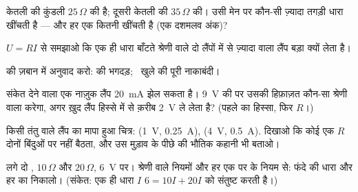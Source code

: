 \begin{exercise}[$\star$]\label{exo:g8:ohms-law:6}
केतली की कुंडली $25\,\Omega$ की है; दूसरी केतली की $35\,\Omega$ की।
उसी मेन पर कौन-सी ज़्यादा तगड़ी धारा खींचती है --- और हर एक कितनी
खींचती है (एक दशमलव अंक)?
\end{exercise}

\begin{exercise}[$\star$]\label{exo:g8:ohms-law:7}
$U = R I$ से समझाओ कि एक ही धारा बाँटते श्रेणी वाले दो लैंपों में से
ज़्यादा  वाला लैंप बड़ा  क्यों लेता है।
\end{exercise}

\begin{exercise}[$\star$]\label{exo:g8:ohms-law:8}
 की ज़बान में अनुवाद करो:  की भगदड़; \ खुले  की
पूरी नाकाबंदी।
\end{exercise}

\begin{exercise}[$\star\star$]\label{exo:g8:ohms-law:9}
संकेत देने वाला एक नाज़ुक लैंप \qty{20}{mA} झेल सकता है। \qty{9}{V}
की  पर उसकी हिफ़ाज़त कौन-सा श्रेणी वाला  करेगा, अगर
ख़ुद लैंप हिस्से में से क़रीब \qty{2}{V} ले लेता है? (पहले 
का हिस्सा, फिर $R$।)
\end{exercise}

\begin{exercise}[$\star\star$]\label{exo:g8:ohms-law:10}
किसी तंतु वाले लैंप का मापा हुआ चित्र: (\qty{1}{V}, \qty{0.25}{A}),
(\qty{4}{V}, \qty{0.5}{A}). दिखाओ कि कोई एक $R$ दोनों बिंदुओं पर
नहीं बैठता, और उस मुड़ाव के पीछे की भौतिक कहानी भी बताओ।
\end{exercise}

\begin{exercise}[$\star\star$]\label{exo:g8:ohms-law:11}
 लगे दो , $10\,\Omega$ और $20\,\Omega$,
\qty{6}{V} पर। श्रेणी वाले नियमों और हर एक पर  के नियम से: फंदे की
धारा और हर  का  निकालो। (संकेत: एक ही धारा $I$
$6 = 10 I + 20 I$ को संतुष्ट करती है।)
\end{exercise}

